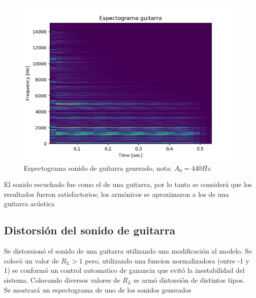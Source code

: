 \documentclass[assd_tp2_main.tex]{subfiles}
\begin{document}
\begin{figure}[H]
	\begin{center}
	\includegraphics[scale=0.5]{graficos/espectograma_guitarra.png}
	\caption{Espectograma sonido de guitarra generado, nota: $A_0=440 Hz$}

	\end{center}
\end{figure}
El sonido escuchado fue como el de una guitarra, por lo tanto se considerá que los resultados fueron satisfactorios; los armónicos se aproximaron a los de una guitarra acústica


\subsection{Distorsión del sonido de guitarra}
Se distorsionó el sonido de una guitarra utilizando una modificación al modelo. Se colocó un valor de $R_L>1$ pero, utilizando una funcion normalizadora (entre -1 y 1) se conformó un control automatico de ganancia que evitó la inestabilidad del sistema. Colocando diversos valores de $R_L$ se armó distorsión de distintos tipos. 
Se mostrará un espectograma de uno de los sonidos generados
\end{document}
